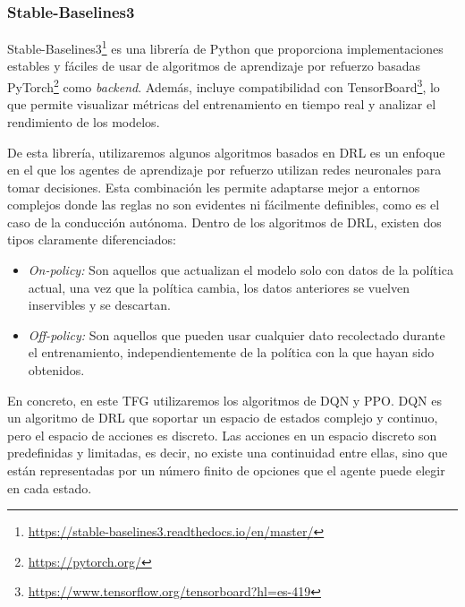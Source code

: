 \subsubsection{Stable-Baselines3}
\label{sec:stable_baselines3}

Stable-Baselines3\footnote{\url{https://stable-baselines3.readthedocs.io/en/master/}} es una librería de Python que proporciona implementaciones estables y fáciles de usar de algoritmos de aprendizaje por refuerzo basadas PyTorch\footnote{\url{https://pytorch.org/}} como \textit{backend}. Además, incluye compatibilidad con TensorBoard\footnote{\url{https://www.tensorflow.org/tensorboard?hl=es-419}}, lo que permite visualizar métricas del entrenamiento en tiempo real y analizar el rendimiento de los modelos. 

De esta librería, utilizaremos algunos algoritmos basados en \ac{DRL} es un enfoque en el que los agentes de aprendizaje por refuerzo utilizan redes neuronales para tomar decisiones. Esta combinación les permite adaptarse mejor a entornos complejos donde las reglas no son evidentes ni fácilmente definibles, como es el caso de la conducción autónoma. Dentro de los algoritmos de \ac{DRL}, existen dos tipos claramente diferenciados:

\begin{itemize}
\item \textit{On-policy:} Son aquellos que actualizan el modelo solo con datos de la política actual, una vez que la política cambia, los datos anteriores se vuelven inservibles y se descartan.
\item \textit{Off-policy:} Son aquellos que pueden usar cualquier dato recolectado durante el entrenamiento, independientemente de la política con la que hayan sido obtenidos.
\end{itemize}

En concreto, en este \ac{TFG} utilizaremos los algoritmos de \ac{DQN} y \ac{PPO}. \ac{DQN} es un algoritmo de \ac{DRL} que soportar un espacio de estados complejo y continuo, pero el espacio de acciones es discreto. Las acciones en un espacio discreto son predefinidas y limitadas, es decir, no existe una continuidad entre ellas, sino que están representadas por un número finito de opciones que el agente puede elegir en cada estado.


